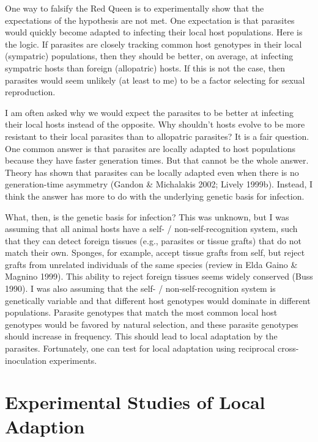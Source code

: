 \documentclass[
  letterpaper,
]{book}
\begin{document}
One way to falsify the Red Queen is to experimentally show that the
expectations of the hypothesis are not met. One expectation is that
parasites would quickly become adapted to infecting their local host
populations. Here is the logic. If parasites are closely tracking common
host genotypes in their local (sympatric) populations, then they should
be better, on average, at infecting sympatric hosts than foreign
(allopatric) hosts. If this is not the case, then parasites would seem
unlikely (at least to me) to be a factor selecting for sexual
reproduction.

I am often asked why we would expect the parasites to be better at
infecting their local hosts instead of the opposite. Why shouldn't hosts
evolve to be more resistant to their local parasites than to allopatric
parasites? It is a fair question. One common answer is that parasites
are locally adapted to host populations because they have faster
generation times. But that cannot be the whole answer. Theory has shown
that parasites can be locally adapted even when there is no
generation-time asymmetry (Gandon \& Michalakis 2002; Lively 1999b).
Instead, I think the answer has more to do with the underlying genetic
basis for infection.

What, then, is the genetic basis for infection? This was unknown, but I
was assuming that all animal hosts have a self- / non-self-recognition
system, such that they can detect foreign tissues (e.g., parasites or
tissue grafts) that do not match their own. Sponges, for example, accept
tissue grafts from self, but reject grafts from unrelated individuals of
the same species (review in Elda Gaino \& Magnino 1999). This ability to
reject foreign tissues seems widely conserved (Buss 1990). I was also
assuming that the self- / non-self-recognition system is genetically
variable and that different host genotypes would dominate in different
populations. Parasite genotypes that match the most common local host
genotypes would be favored by natural selection, and these parasite
genotypes should increase in frequency. This should lead to local
adaptation by the parasites. Fortunately, one can test for local
adaptation using reciprocal cross-inoculation experiments.

\section{Experimental Studies of Local
Adaption}\label{experimental-studies-of-local-adaption}
\end{document}
